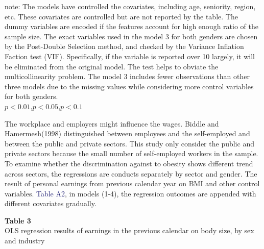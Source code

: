 \documentclass{article}
\begin{document}
\begin{footnotesize} note: The models have controlled the covariates, including age, seniority, region, etc. These covariates are controlled but are not reported by the table. The dummy variables are encoded if the features account for high enough ratio of the sample size. The exact variables used in the model 3 for both genders are chosen by the Post-Double Selection method, and checked by the Variance Inflation Faction test (VIF). Specifically, if the variable is reported over 10 largely, it will be eliminated from the original model. The test helps to obviate the multicollinearity problem. The model 3 includes fewer observations than other three models due to the missing values while considering more control variables for both genders. \\
\textnormal{\superscript{***}}$p<0.01$,\textnormal{\superscript{**}}$p<0.05$,\textnormal{\superscript{*}}$p<0.1$\normalsize
\end{footnotesize}


\newpage






The workplace and employers might influence the wages. Biddle and Hamermesh(1998) distinguished between employees and the self-employed and between the public and private sectors. This study only consider the public and private sectors because the small number of self-employed workers in the sample. To examine whether the discrimination against to obesity shows different trend across sectors, the regressions are conducts separately by sector and gender. The result of personal earnings from previous calendar year on BMI and other control variables. \textcolor{MidnightBlue}{Table A2}, in models (1-4), the regression outcomes are appended with different covariates gradually. 

\vspace{20pt}

\noindent
\textbf{Table 3} \\
OLS regression results of earnings in the previous calendar on body size, by sex and industry
\end{document}
